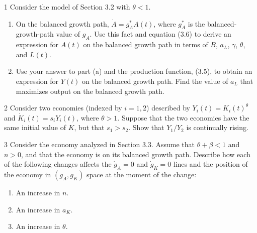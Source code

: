 
\begin{problem}{1}
Consider the model of Section 3.2 with \(\theta<1\).
\begin{enumerate}[label=(\alph*)]
    \item On the balanced growth path, \(\dot{A}=g_A^*A\left(t\right)\), where \(g_A^*\) is the balanced-growth-path value of \(g_A\). Use this fact and equation (3.6) to derive an expression for \(A\left(t\right)\) on the balanced growth path in terms of \(B\), \(a_L\), \(\gamma\), \(\theta\), and \(L\left(t\right)\).
    \item Use your answer to part (a) and the production function, (3.5), to obtain an expression for \(Y\left(t\right)\) on the balanced growth path. Find the value of \(a_L\) that maximizes output on the balanced growth path.
\end{enumerate}
\end{problem}

\begin{problem}{2}
Consider two economies (indexed by \(i=1,2\)) described by \(Y_i\left(t\right)=K_i\left(t\right)^\theta\) and \(\dot{K}_i\left(t\right)=s_iY_i\left(t\right)\), where \(\theta>1\). Suppose that the two economies have the same initial value of \(K\), but that \(s_1>s_2\). Show that \(Y_1/Y_2\) is continually rising.
\end{problem}

\begin{problem}{3}
Consider the economy analyzed in Section 3.3. Assume that \(\theta+\beta<1\) and \(n>0\), and that the economy is on its balanced growth path. Describe how each of the following changes affects the \(\dot{g}_A=0\) and \(\dot{g}_K=0\) lines and the position of the economy in \(\left(g_A,g_K\right)\) space at the moment of the change:
\begin{enumerate}[label=(\alph*)]
    \item An increase in \(n\).
    \item An increase in \(a_K\).
    \item An increase in \(\theta\).
\end{enumerate}
\end{problem}


